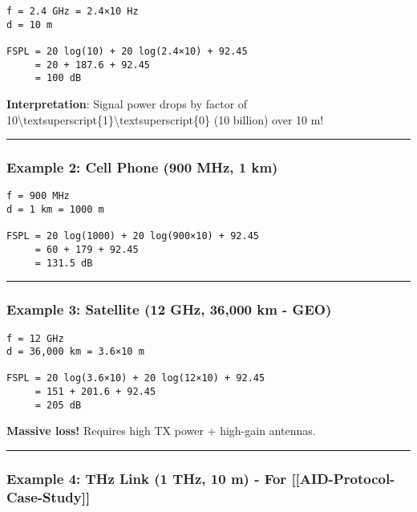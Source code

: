 \begin{verbatim}
f = 2.4 GHz = 2.4×10 Hz
d = 10 m

FSPL = 20 log(10) + 20 log(2.4×10) + 92.45
     = 20 + 187.6 + 92.45
     = 100 dB
\end{verbatim}

\textbf{Interpretation}: Signal power drops by factor of
10\textbackslash textsuperscript\{1\}\textbackslash textsuperscript\{0\}
(10 billion) over 10 m!

\begin{center}\rule{0.5\linewidth}{0.5pt}\end{center}

\subsubsection{Example 2: Cell Phone (900 MHz, 1
km)}\label{example-2-cell-phone-900-mhz-1-km}

\begin{verbatim}
f = 900 MHz
d = 1 km = 1000 m

FSPL = 20 log(1000) + 20 log(900×10) + 92.45
     = 60 + 179 + 92.45
     = 131.5 dB
\end{verbatim}

\begin{center}\rule{0.5\linewidth}{0.5pt}\end{center}

\subsubsection{Example 3: Satellite (12 GHz, 36,000 km -
GEO)}\label{example-3-satellite-12-ghz-36000-km---geo}

\begin{verbatim}
f = 12 GHz
d = 36,000 km = 3.6×10 m

FSPL = 20 log(3.6×10) + 20 log(12×10) + 92.45
     = 151 + 201.6 + 92.45
     = 205 dB
\end{verbatim}

\textbf{Massive loss!} Requires high TX power + high-gain antennas.

\begin{center}\rule{0.5\linewidth}{0.5pt}\end{center}

\subsubsection{Example 4: THz Link (1 THz, 10 m) - For
{[}{[}AID-Protocol-Case-Study{]}{]}}\label{example-4-thz-link-1-thz-10-m---for-aid-protocol-case-study}

